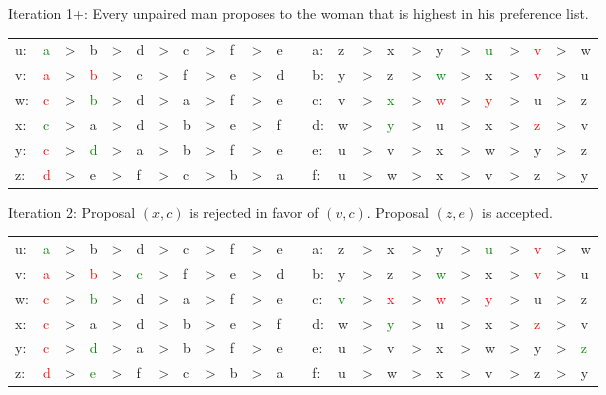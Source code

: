 \documentclass{amsart}
\begin{document}
\begin{enumerate}
Iteration 1+: Every unpaired man proposes to the woman that is highest in his preference list. 
\begin{center}
\begin{tabular}{LLLLLLLLLLLLL LLLLLLLLLLLL }
u:&\textcolor{green}{a}&>&b&>&d&>&c&>&f&>&e& \quad \quad &a:&z&>&x&>&y&>&\textcolor{green}{u}&>&\textcolor{red}{v}&>&w\\
v:&\textcolor{red}{a}&>&\textcolor{red}{b}&>&c&>&f&>&e&>&d& \quad \quad &b:&y&>&z&>&\textcolor{green}{w}&>&x&>&\textcolor{red}{v}&>&u\\
w:&\textcolor{red}{c}&>&\textcolor{green}{b}&>&d&>&a&>&f&>&e& \quad \quad &c:&v&>&\textcolor{green}{x}&>&\textcolor{red}{w}&>&\textcolor{red}{y}&>&u&>&z\\
x:&\textcolor{green}{c}&>&a&>&d&>&b&>&e&>&f& \quad \quad &d:&w&>&\textcolor{green}{y}&>&u&>&x&>&\textcolor{red}{z}&>&v\\
y:&\textcolor{red}{c}&>&\textcolor{green}{d}&>&a&>&b&>&f&>&e& \quad \quad &e:&u&>&v&>&x&>&w&>&y&>&z\\
z:&\textcolor{red}{d}&>&e&>&f&>&c&>&b&>&a& \quad \quad &f:&u&>&w&>&x&>&v&>&z&>&y\\
\end{tabular}
\end{center}
\vspace{.25in}

Iteration 2: Proposal $(x,c)$ is rejected in favor of $(v,c)$. Proposal $(z,e)$ is accepted.
\begin{center}
\begin{tabular}{LLLLLLLLLLLLL LLLLLLLLLLLL }
u:&\textcolor{green}{a}&>&b&>&d&>&c&>&f&>&e& \quad \quad &a:&z&>&x&>&y&>&\textcolor{green}{u}&>&\textcolor{red}{v}&>&w\\
v:&\textcolor{red}{a}&>&\textcolor{red}{b}&>&\textcolor{green}{c}&>&f&>&e&>&d& \quad \quad &b:&y&>&z&>&\textcolor{green}{w}&>&x&>&\textcolor{red}{v}&>&u\\
w:&\textcolor{red}{c}&>&\textcolor{green}{b}&>&d&>&a&>&f&>&e& \quad \quad &c:&\textcolor{green}{v}&>&\textcolor{red}{x}&>&\textcolor{red}{w}&>&\textcolor{red}{y}&>&u&>&z\\
x:&\textcolor{red}{c}&>&a&>&d&>&b&>&e&>&f& \quad \quad &d:&w&>&\textcolor{green}{y}&>&u&>&x&>&\textcolor{red}{z}&>&v\\
y:&\textcolor{red}{c}&>&\textcolor{green}{d}&>&a&>&b&>&f&>&e& \quad \quad &e:&u&>&v&>&x&>&w&>&y&>&\textcolor{green}{z}\\
z:&\textcolor{red}{d}&>&\textcolor{green}{e}&>&f&>&c&>&b&>&a& \quad \quad &f:&u&>&w&>&x&>&v&>&z&>&y\\
\end{tabular}
\end{center}
\vspace{.25in}



\end{enumerate}
\end{document}
